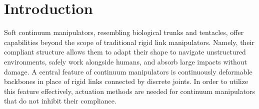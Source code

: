 \section{Introduction}
\label{sec:introduction}

Soft continuum manipulators, resembling biological trunks and tentacles, offer capabilities beyond the scope of traditional rigid link manipulators. Namely, their compliant structure allows them to adapt their shape to navigate unstructured environments, safely work alongside humans, and absorb large impacts without damage. A central feature of continuum manipulators is continuously deformable backbones in place of rigid links connected by discrete joints. In order to utilize this feature effectively, actuation methods are needed for continuum manipulators that do not inhibit their compliance.

